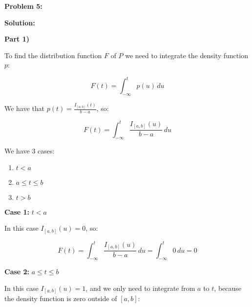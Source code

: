 \textbf{Problem 5:}

\singlespacing

\textbf{Solution:}

\singlespacing

\textbf{Part 1)}

\singlespacing

To find the distribution function $F$ of $P$ we need to integrate the density function $p$:

\singlespacing

\begin{equation}
    F(t) = \int_{-\infty}^{t} p(u) \, du
\end{equation}

\singlespacing

We have that $p(t) = \frac{I_{[a,b]}(t)}{b-a}$, so:

\singlespacing

\begin{equation}
    F(t) = \int_{-\infty}^{t} \frac{I_{[a,b]}(u)}{b-a} \, du
\end{equation}

\singlespacing

We have 3 cases:

\singlespacing

\begin{enumerate}
    \item $t < a$
    \item $a \leq t \leq b$
    \item $t > b$
\end{enumerate}

\singlespacing

\textbf{Case 1:} $t < a$

\singlespacing

In this case $I_{[a,b]}(u) = 0$, so:

\singlespacing

\begin{equation}
    F(t) = \int_{-\infty}^{t} \frac{I_{[a,b]}(u)}{b-a} \, du = \int_{-\infty}^{t} 0 \, du = 0
\end{equation}

\singlespacing

\textbf{Case 2:} $a \leq t \leq b$

\singlespacing

In this case $I_{[a,b]}(u) = 1$, and we only need to integrate from $a$ to $t$,
because the density function is zero outside of $[a, b]$:

\singlespacing

